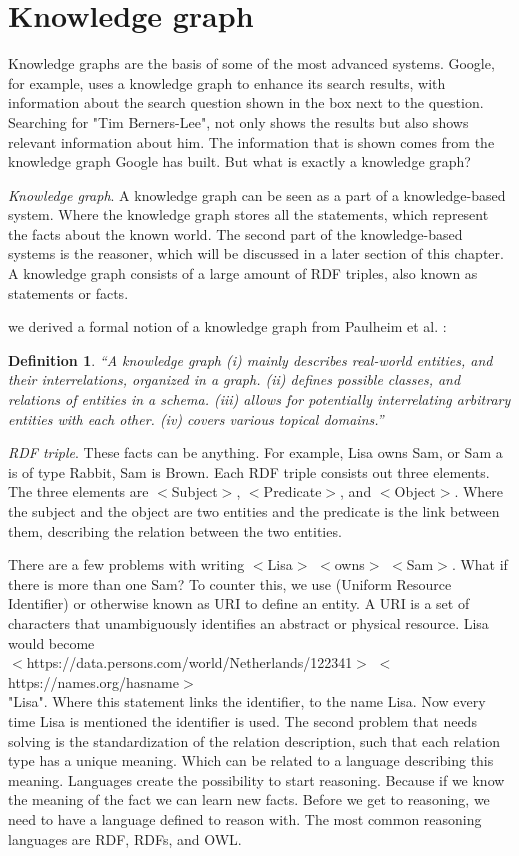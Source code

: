 \documentclass[11pt,letterpaper ,oneside ]{book}
\newtheorem{definition}{Definition}
\begin{document}
	\section{Knowledge graph}\label{graphElements}
	Knowledge graphs are the basis of some of the most advanced systems. Google, for example, uses a knowledge graph to enhance its search results, with information about the search question shown in the box next to the question. Searching for "Tim Berners-Lee", not only shows the results but also shows relevant information about him. The information that is shown comes from the knowledge graph Google has built. But what is exactly a knowledge graph?
	
	\textit{Knowledge graph}. 
	A knowledge graph can be seen as a part of a knowledge-based system. Where the knowledge graph stores all the statements, which represent the facts about the known world. The second part of the knowledge-based systems is the reasoner, which will be discussed in a later section of this chapter. A knowledge graph consists of a large amount of RDF triples, also known as statements or facts.
	
	we derived a formal notion of a knowledge graph from Paulheim et al. \cite{HeikoP:2016}:
	\begin{definition} 
		“A knowledge graph (i) mainly describes real-world entities, and their interrelations, organized in a graph. (ii) defines possible classes, and relations of entities in a schema. (iii) allows for potentially interrelating arbitrary entities with each other. (iv) covers various topical domains.”
	\end{definition}
	
	\textit{RDF triple}. These facts can be anything. For example, Lisa owns Sam, or Sam a is of type Rabbit, Sam is Brown. Each RDF triple consists out three elements.
	The three elements are $<$Subject$>$, $<$Predicate$>$, and $<$Object$>$. Where the subject and the object are two entities and the predicate is the link between them, describing the relation between the two entities. 
	
	There are a few problems with writing $<$Lisa$>$ $<$owns$>$ $<$Sam$>$. What if there is more than one Sam? To counter this, we use (Uniform Resource Identifier) or otherwise known as URI to define an entity. A URI is a set of characters that unambiguously identifies an abstract or physical resource. Lisa would become \\$<$https://data.persons.com/world/Netherlands/122341$>$ $<$https://names.org/hasname$>$ \\ "Lisa". Where this statement links the identifier, to the name Lisa. Now every time Lisa is mentioned the identifier is used. 
	The second problem that needs solving is the standardization of the relation description, such that each relation type has a unique meaning. Which can be related to a language describing this meaning. Languages create the possibility to start reasoning. Because if we know the meaning of the fact we can learn new facts. Before we get to reasoning, we need to have a language defined to reason with. The most common reasoning languages are RDF, RDFs, and OWL.
	
\end{document}
